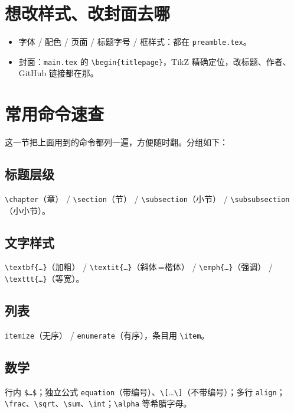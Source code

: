 \section{想改样式、改封面去哪}

\begin{itemize}
  \item 字体 / 配色 / 页面 / 标题字号 / 框样式：都在 \texttt{preamble.tex}。
  \item 封面：\texttt{main.tex} 的 \texttt{\textbackslash begin\{titlepage\}}，TikZ 精确定位，改标题、作者、GitHub 链接都在那。
\end{itemize}

\section{常用命令速查}

这一节把上面用到的命令都列一遍，方便随时翻。分组如下：

\subsection{标题层级}

\texttt{\textbackslash chapter}（章） / \texttt{\textbackslash section}（节） / \texttt{\textbackslash subsection}（小节） / \texttt{\textbackslash subsubsection}（小小节）。

\subsection{文字样式}

\texttt{\textbackslash textbf\{…\}}（加粗） / \texttt{\textbackslash textit\{…\}}（斜体\,=楷体） / \texttt{\textbackslash emph\{…\}}（强调） / \texttt{\textbackslash texttt\{…\}}（等宽）。

\subsection{列表}

\texttt{itemize}（无序） / \texttt{enumerate}（有序），条目用 \texttt{\textbackslash item}。

\subsection{数学}

行内 \texttt{\$…\$}；独立公式 \texttt{equation}（带编号）、\texttt{\textbackslash[}…\texttt{\textbackslash]}（不带编号）；多行 \texttt{align}；\texttt{\textbackslash frac}、\texttt{\textbackslash sqrt}、\texttt{\textbackslash sum}、\texttt{\textbackslash int}；\texttt{\textbackslash alpha} 等希腊字母。

